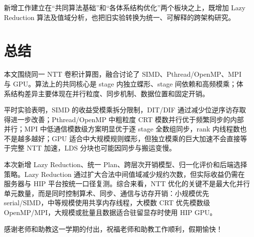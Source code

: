 新增工作建立在“共同算法基础”和“各体系结构优化”两个板块之上，既增加 Lazy Reduction 算法及值域分析，也把旧实验转换为统一、可解释的跨架构研究。
\section{总结}

本文围绕同一 NTT 卷积计算图，融合讨论了 SIMD、Pthread/OpenMP、MPI 与 GPU。算法上的共同核心是 stage 内独立蝶形、stage 间依赖和高频模乘；体系结构差异主要体现在并行粒度、同步机制、数据位置和固定开销。

平时实验表明，SIMD 的收益受模乘拆分限制，DIT/DIF 通过减少位逆序访存取得进一步改善；Pthread/OpenMP 中粗粒度 CRT 模数并行优于频繁同步的内部并行；MPI 中低通信模数级方案明显优于逐 stage 全数组同步，rank 内线程数也不是越多越好；GPU 适合中大规模规则蝶形，但独立模乘的巨大加速不会直接等于完整 NTT 加速，LDS 分块也可能因同步与搬运变慢。

本次新增 Lazy Reduction、统一 Plan、跨层次开销模型、归一化评价和后端选择策略。Lazy Reduction 通过扩大合法中间值域减少规约次数，但实际收益仍需在服务器与 HIP 平台按统一口径复测。综合来看，NTT 优化的关键不是最大化并行单元数量，而是同时控制算术、同步、通信与访存开销：小规模优先 serial/SIMD，中等规模使用共享内存线程，大模数 CRT 优先模数级 OpenMP/MPI，大规模或批量且数据适合驻留显存时使用 HIP GPU。

感谢老师和助教这一学期的付出，祝福老师和助教工作顺利，假期愉快！
